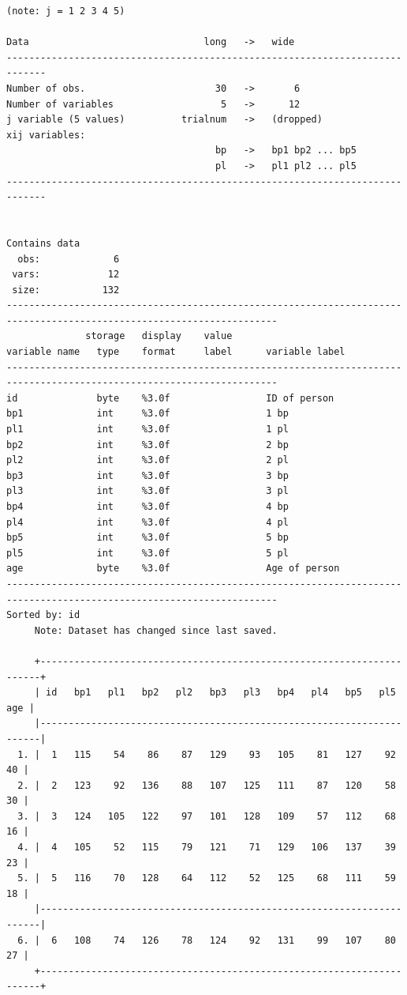 \documentclass[
]{book}
\begin{document}
\begin{verbatim}
(note: j = 1 2 3 4 5)

Data                               long   ->   wide
-----------------------------------------------------------------------------
Number of obs.                       30   ->       6
Number of variables                   5   ->      12
j variable (5 values)          trialnum   ->   (dropped)
xij variables:
                                     bp   ->   bp1 bp2 ... bp5
                                     pl   ->   pl1 pl2 ... pl5
-----------------------------------------------------------------------------


Contains data
  obs:             6                          
 vars:            12                          
 size:           132                          
----------------------------------------------------------------------------------------------------------------------
              storage   display    value
variable name   type    format     label      variable label
----------------------------------------------------------------------------------------------------------------------
id              byte    %3.0f                 ID of person
bp1             int     %3.0f                 1 bp
pl1             int     %3.0f                 1 pl
bp2             int     %3.0f                 2 bp
pl2             int     %3.0f                 2 pl
bp3             int     %3.0f                 3 bp
pl3             int     %3.0f                 3 pl
bp4             int     %3.0f                 4 bp
pl4             int     %3.0f                 4 pl
bp5             int     %3.0f                 5 bp
pl5             int     %3.0f                 5 pl
age             byte    %3.0f                 Age of person
----------------------------------------------------------------------------------------------------------------------
Sorted by: id
     Note: Dataset has changed since last saved.

     +----------------------------------------------------------------------+
     | id   bp1   pl1   bp2   pl2   bp3   pl3   bp4   pl4   bp5   pl5   age |
     |----------------------------------------------------------------------|
  1. |  1   115    54    86    87   129    93   105    81   127    92    40 |
  2. |  2   123    92   136    88   107   125   111    87   120    58    30 |
  3. |  3   124   105   122    97   101   128   109    57   112    68    16 |
  4. |  4   105    52   115    79   121    71   129   106   137    39    23 |
  5. |  5   116    70   128    64   112    52   125    68   111    59    18 |
     |----------------------------------------------------------------------|
  6. |  6   108    74   126    78   124    92   131    99   107    80    27 |
     +----------------------------------------------------------------------+
\end{verbatim}
\end{document}
